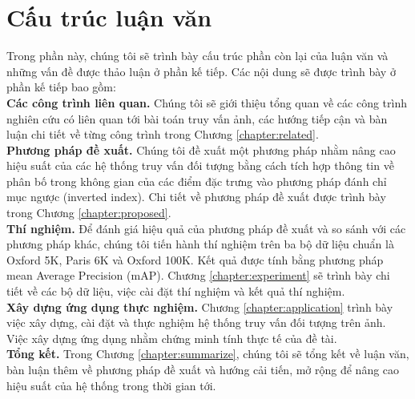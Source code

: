 \section{Cấu trúc luận văn}
Trong phần này, chúng tôi sẽ trình bày cấu trúc phần còn lại của luận văn và những vấn đề được thảo luận ở phần kế tiếp. Các nội dung sẽ được trình bày ở phần kế tiếp bao gồm:\\
 \textbf{Các công trình liên quan.} Chúng tôi sẽ giới thiệu tổng quan về các công trình nghiên cứu có liên quan tới bài toán truy vấn ảnh, các hướng tiếp cận và bàn luận chi tiết về từng công trình trong Chương \ref{chapter:related}.\\
 \textbf{Phương pháp đề xuất.} Chúng tôi đề xuất một phương pháp nhằm nâng cao hiệu suất của các hệ thống truy vấn đối tượng bằng cách tích hợp thông tin về phân bố trong không gian của các điểm đặc trưng vào phương pháp đánh chỉ mục ngược (inverted index). Chi tiết về phương pháp đề xuất được trình bày trong Chương \ref{chapter:proposed}.\\
 \textbf{Thí nghiệm.} Để đánh giá hiệu quả của phương pháp đề xuất và so sánh với các phương pháp khác, chúng tôi tiến hành thí nghiệm trên ba bộ dữ liệu chuẩn là Oxford 5K, Paris 6K và Oxford 100K. Kết quả được tính bằng phương pháp mean Average Precision (mAP). Chương \ref{chapter:experiment} sẽ trình bày chi tiết về các bộ dữ liệu, việc cài đặt thí nghiệm và kết quả thí nghiệm.\\
 \textbf{Xây dựng ứng dụng thực nghiệm.} Chương \ref{chapter:application} trình bày việc xây dựng, cài đặt và thực nghiệm hệ thống truy vấn đối tượng trên ảnh. Việc xây dựng ứng dụng nhằm chứng minh tính thực tế của đề tài.\\
 \textbf{Tổng kết.} Trong Chương \ref{chapter:summarize}, chúng tôi sẽ tổng kết về luận văn, bàn luận thêm về phương pháp đề xuất và hướng cải tiến, mở rộng để nâng cao hiệu suất của hệ thống trong thời gian tới.